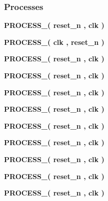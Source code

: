 \subsubsection*{Processes}
 \begin{DoxyCompactItemize}
\item 
{\bf P\+R\+O\+C\+E\+S\+S\+\_}{\bfseries  ( {\bfseries {\bfseries {\bf reset\+\_\+n}} \textcolor{vhdlchar}{ }} , {\bfseries {\bfseries {\bf clk}} \textcolor{vhdlchar}{ }} )}
\item 
{\bf P\+R\+O\+C\+E\+S\+S\+\_}{\bfseries  ( {\bfseries {\bfseries {\bf clk}} \textcolor{vhdlchar}{ }} , {\bfseries {\bfseries {\bf reset\+\_\+n}} \textcolor{vhdlchar}{ }} )}
\item 
{\bf P\+R\+O\+C\+E\+S\+S\+\_}{\bfseries  ( {\bfseries {\bfseries {\bf reset\+\_\+n}} \textcolor{vhdlchar}{ }} , {\bfseries {\bfseries {\bf clk}} \textcolor{vhdlchar}{ }} )}
\item 
{\bf P\+R\+O\+C\+E\+S\+S\+\_}{\bfseries  ( {\bfseries {\bfseries {\bf reset\+\_\+n}} \textcolor{vhdlchar}{ }} , {\bfseries {\bfseries {\bf clk}} \textcolor{vhdlchar}{ }} )}
\item 
{\bf P\+R\+O\+C\+E\+S\+S\+\_}{\bfseries  ( {\bfseries {\bfseries {\bf reset\+\_\+n}} \textcolor{vhdlchar}{ }} , {\bfseries {\bfseries {\bf clk}} \textcolor{vhdlchar}{ }} )}
\item 
{\bf P\+R\+O\+C\+E\+S\+S\+\_}{\bfseries  ( {\bfseries {\bfseries {\bf reset\+\_\+n}} \textcolor{vhdlchar}{ }} , {\bfseries {\bfseries {\bf clk}} \textcolor{vhdlchar}{ }} )}
\item 
{\bf P\+R\+O\+C\+E\+S\+S\+\_}{\bfseries  ( {\bfseries {\bfseries {\bf reset\+\_\+n}} \textcolor{vhdlchar}{ }} , {\bfseries {\bfseries {\bf clk}} \textcolor{vhdlchar}{ }} )}
\item 
{\bf P\+R\+O\+C\+E\+S\+S\+\_}{\bfseries  ( {\bfseries {\bfseries {\bf reset\+\_\+n}} \textcolor{vhdlchar}{ }} , {\bfseries {\bfseries {\bf clk}} \textcolor{vhdlchar}{ }} )}
\item 
{\bf P\+R\+O\+C\+E\+S\+S\+\_}{\bfseries  ( {\bfseries {\bfseries {\bf reset\+\_\+n}} \textcolor{vhdlchar}{ }} , {\bfseries {\bfseries {\bf clk}} \textcolor{vhdlchar}{ }} )}
\item 
{\bf P\+R\+O\+C\+E\+S\+S\+\_}{\bfseries  ( {\bfseries {\bfseries {\bf reset\+\_\+n}} \textcolor{vhdlchar}{ }} , {\bfseries {\bfseries {\bf clk}} \textcolor{vhdlchar}{ }} )}
\item 
{\bf P\+R\+O\+C\+E\+S\+S\+\_}{\bfseries  ( {\bfseries {\bfseries {\bf reset\+\_\+n}} \textcolor{vhdlchar}{ }} , {\bfseries {\bfseries {\bf clk}} \textcolor{vhdlchar}{ }} )}

\end{DoxyCompactItemize}
